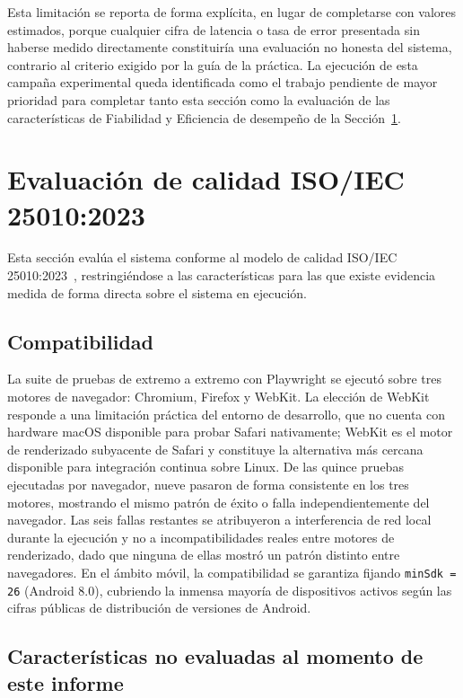 \documentclass[11pt,a4paper]{article}
\begin{document}
Esta limitación se reporta de forma explícita, en lugar de completarse
con valores estimados, porque cualquier cifra de latencia o tasa de
error presentada sin haberse medido directamente constituiría una
evaluación no honesta del sistema, contrario al criterio exigido por la
guía de la práctica. La ejecución de esta campaña experimental queda
identificada como el trabajo pendiente de mayor prioridad para
completar tanto esta sección como la evaluación de las características
de Fiabilidad y Eficiencia de desempeño de la Sección~\ref{sec:iso25010}.

\section{Evaluación de calidad ISO/IEC 25010:2023}
\label{sec:iso25010}

Esta sección evalúa el sistema conforme al modelo de calidad
ISO/IEC 25010:2023~\cite{iso25010:2023}, restringiéndose a las
características para las que existe evidencia medida de forma directa
sobre el sistema en ejecución.

\subsection{Compatibilidad}

La suite de pruebas de extremo a extremo con Playwright se ejecutó
sobre tres motores de navegador: Chromium, Firefox y WebKit. La
elección de WebKit responde a una limitación práctica del entorno de
desarrollo, que no cuenta con hardware macOS disponible para probar
Safari nativamente; WebKit es el motor de renderizado subyacente de
Safari y constituye la alternativa más cercana disponible para
integración continua sobre Linux. De las quince pruebas ejecutadas por
navegador, nueve pasaron de forma consistente en los tres motores,
mostrando el mismo patrón de éxito o falla independientemente del
navegador. Las seis fallas restantes se atribuyeron a interferencia de
red local durante la ejecución y no a incompatibilidades reales entre
motores de renderizado, dado que ninguna de ellas mostró un patrón
distinto entre navegadores. En el ámbito móvil, la compatibilidad se
garantiza fijando \texttt{minSdk = 26} (Android 8.0), cubriendo la
inmensa mayoría de dispositivos activos según las cifras públicas de
distribución de versiones de Android.

\subsection{Características no evaluadas al momento de este informe}
\end{document}
